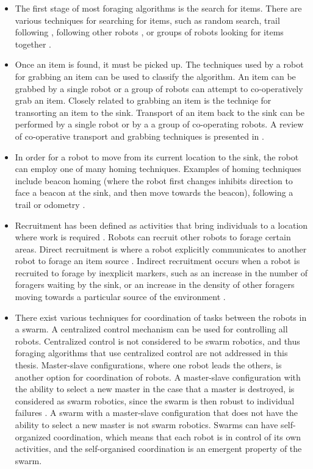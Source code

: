 \begin{itemize}
\item The first stage of most foraging algorithms is the search for items. There are various techniques for searching for items, such as random search, trail following \cite{schmickl2006trophallaxis}, following other robots \cite{dorigo2013swarmanoid, werger1996robotic}, or groups of robots looking for items together \cite{vincent2004framework}.

\item Once an item is found, it must be picked up. The techniques used by a robot for grabbing an item can be used to classify the algorithm. An item can be grabbed by a single robot or a group of robots can attempt to co-operatively grab an item. Closely related to grabbing an item is the techniqe for transorting an item to the sink. Transport of an item back to the sink can be performed by a single robot or by a a group of co-operating robots. A review of co-operative transport and grabbing techniques is presented in \cite{kube2000cooperative}.

\item In order for a robot to move from its current location to the sink, the robot can employ one of many homing techniques. Examples of homing techniques include beacon homing (where the robot first changes inhibits direction to face a beacon at the sink, and then move towards the beacon), following a trail or odometry \cite{winfield2009towards}.

\item Recruitment has been defined as activities that bring individuals to a location where work is required \cite{holldobler1990ants}. Robots can recruit other robots to forage certain areas. Direct recruitment is where a robot explicitly communicates to another robot to forage an item source \cite{krieger2000ant,labella2006division}. Indirect recruitment occurs when a robot is recruited to forage by inexplicit markers, such as an increase in the number of foragers waiting by the sink, or an increase in the density of other foragers moving towards a particular source of the environment \cite{arkin1992cooperation}. 

\item There exist various techniques for coordination of tasks between the robots in a swarm. A centralized control mechanism can be used for controlling all robots. Centralized control is not considered to be swarm robotics, and thus foraging algorithms that use centralized control are not addressed in this thesis. Master-slave configurations, where one robot leads the others, is another option for coordination of robots. A master-slave configuration with the ability to select a new master in the case that a master is destroyed, is considered as swarm robotics, since the swarm is then robust to individual failures \cite{karpov2015leader, hoeing2007auction}. A swarm with a master-slave configuration that does not have the ability to select a new master is not swarm robotics. Swarms can have self-organized coordination, which means that each robot is in control of its own activities, and the self-organised coordination is an emergent property of the swarm. %
\end{itemize}

